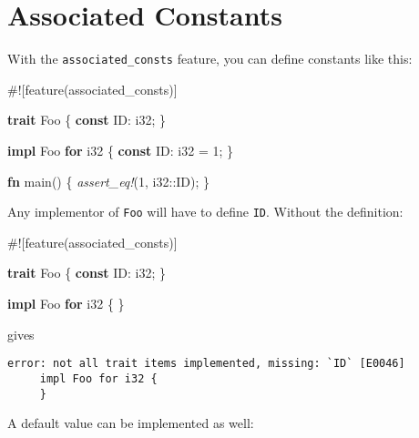 \documentclass[a4paper,]{book}
\newenvironment{Shaded}{\begin{snugshade}}{\end{snugshade}}
\newcommand{\KeywordTok}[1]{\textcolor[rgb]{0.13,0.29,0.53}{\textbf{{#1}}}}
\newcommand{\DataTypeTok}[1]{\textcolor[rgb]{0.13,0.29,0.53}{{#1}}}
\newcommand{\DecValTok}[1]{\textcolor[rgb]{0.00,0.00,0.81}{{#1}}}
\newcommand{\PreprocessorTok}[1]{\textcolor[rgb]{0.56,0.35,0.01}{\textit{{#1}}}}
\newcommand{\AttributeTok}[1]{\textcolor[rgb]{0.77,0.63,0.00}{{#1}}}
\newcommand{\NormalTok}[1]{{#1}}
\begin{document}
\section{Associated Constants}\label{sec--associated-constants}

With the \texttt{associated\_consts} feature, you can define constants
like this:

\begin{Shaded}
\begin{Highlighting}[]
\AttributeTok{#![}\NormalTok{feature}\AttributeTok{(}\NormalTok{associated_consts}\AttributeTok{)]}

\KeywordTok{trait} \NormalTok{Foo \{}
    \KeywordTok{const} \NormalTok{ID: }\DataTypeTok{i32}\NormalTok{;}
\NormalTok{\}}

\KeywordTok{impl} \NormalTok{Foo }\KeywordTok{for} \DataTypeTok{i32} \NormalTok{\{}
    \KeywordTok{const} \NormalTok{ID: }\DataTypeTok{i32} \NormalTok{= }\DecValTok{1}\NormalTok{;}
\NormalTok{\}}

\KeywordTok{fn} \NormalTok{main() \{}
    \PreprocessorTok{assert_eq!}\NormalTok{(}\DecValTok{1}\NormalTok{, }\DataTypeTok{i32}\NormalTok{::ID);}
\NormalTok{\}}
\end{Highlighting}
\end{Shaded}

Any implementor of \texttt{Foo} will have to define \texttt{ID}. Without
the definition:

\begin{Shaded}
\begin{Highlighting}[]
\AttributeTok{#![}\NormalTok{feature}\AttributeTok{(}\NormalTok{associated_consts}\AttributeTok{)]}

\KeywordTok{trait} \NormalTok{Foo \{}
    \KeywordTok{const} \NormalTok{ID: }\DataTypeTok{i32}\NormalTok{;}
\NormalTok{\}}

\KeywordTok{impl} \NormalTok{Foo }\KeywordTok{for} \DataTypeTok{i32} \NormalTok{\{}
\NormalTok{\}}
\end{Highlighting}
\end{Shaded}

gives

\begin{verbatim}
error: not all trait items implemented, missing: `ID` [E0046]
     impl Foo for i32 {
     }
\end{verbatim}

A default value can be implemented as well:
\end{document}
